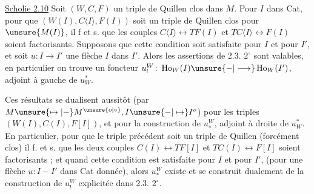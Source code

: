
\uline{Scholie 2.10} Soit $(W,C,F)$ un triple de Quillen
clos dans $M$. Pour  $I$ dans Cat, pour que
$(W(I),C\langle I\rangle,F(I))$ soit un triple de Quillen
clos pour $\unsure{M(I)}$, il f et s. que les
couples $C\langle I\rangle\longleftrightarrow TF(I)$ et $TC\langle I\rangle\longleftrightarrow F(I)$
soient factorisants. Supposons que cette
condition soit satisfaite pour $I$ et pour $I'$,
et soit $u\colon I\longrightarrow I'$ une flèche 
$I$ dans $I'$. Alors les assertions de 2.3. $2^\circ$
sont valables, en particulier on trouve un
foncteur $u_!^W\colon\operatorname{Ho}_W(I)\unsure{-|\longrightarrow}\operatorname{Ho}_W(I')$, adjoint
à gauche de $u^*_W$.


Ces résultats se
dualisent aussitôt (par $M\unsure{\mapsto|-} M^{\unsure{o|\circ}}, I\unsure{-|\mapsto}I^{o}$)
pour les triples $(W(I),C(I),F[I])$,
et pour la construction de $u_*^W$, adjoint
à droite de $u^*_W$. En particulier, pour que
le triple précédent soit un triple de Quillen
(forcément clos) il f. et s. que les deux
couples $C(I)\longleftrightarrow TF[I]$ et $TC(I)\longleftrightarrow F[I]$
soient factorisants ; et quand cette condition
est satisfaite pour $I$ et pour $I'$, (pour une
flèche $u\colon I\mathrel{-} I'$ dans Cat donnée), alors
$u_*^W$ existe et se construit dualement de
la construction de $u_!^W$ explicitée dans
2.3. $2^\circ$.
